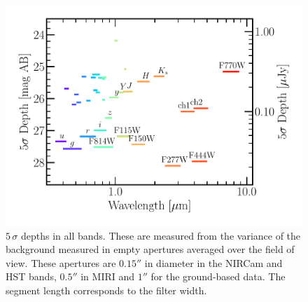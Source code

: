\documentclass[longauth]{aa}
\begin{document}
\begin{figure}[t!]
\includegraphics[width=1\columnwidth]{figures/depth_of_bands.pdf}
\caption{$5\,\sigma$ depths in all bands. These are measured from the variance of the background measured in empty apertures averaged over the field of view. These apertures are $\ang{;;0.15}$ in diameter in the NIRCam and HST bands,  $\ang{;;0.5}$ in MIRI and $\ang{;;1}$ for the ground-based data. The segment length corresponds to the filter width.
\label{fig:depth-of-bands}}
\end{figure}
\end{document}
